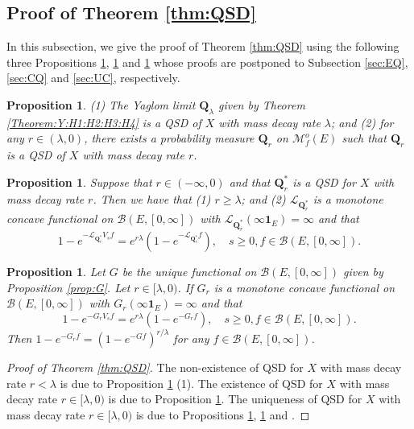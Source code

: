 \documentclass[12pt,a4paper]{amsart}
\numberwithin{equation}{section}
\theoremstyle{plain}
\newtheorem{prop}[thm]{Proposition}
\theoremstyle{definition}
\theoremstyle{remark}
\begin{document}
\subsection{Proof of Theorem \ref{thm:QSD}}
	In this subsection,
	we give the proof of Theorem \ref{thm:QSD} using the following three
Propositions \ref{prop:EQ}, \ref{prop:CQ} and \ref{prop:UC}  whose proofs are postponed to
Subsection \ref{sec:EQ}, \ref{sec:CQ} and \ref{sec:UC}, respectively.

\begin{prop} \label{prop:EQ}
	(1) The Yaglom limit $\mathbf Q_\lambda$ given by Theorem \ref{Theorem:Y:H1:H2:H3:H4} is a QSD of $X$ with mass decay rate $\lambda$; and
	(2) for any $r \in (\lambda , 0)$, %
	there exists a probability measure $\mathbf Q_r$  on $\mathcal M^o_f(E)$
such that  $\mathbf Q_r$ is a QSD of $X$ with mass decay rate $r$.
\end{prop}


\begin{prop} \label{prop:CQ}
	Suppose that $r \in (-\infty, 0)$ and that  $\mathbf Q^*_{r}$
	is a QSD
	for $X$ with mass decay rate $r$.
	Then we have that (1) $r \geq \lambda$; and
	(2) $\mathscr L_{\mathbf Q^*_r}$ is a monotone concave functional on $\mathcal B(E,[0,\infty])$ %
	with $\mathscr L_{\mathbf Q^*_r}(\infty \mathbf 1_E) = \infty$ and that
\[
	1 - e^{- \mathscr L_{\mathbf Q^*_r} V_s f} = e^{r\lambda }(1- e^{- \mathscr L_{\mathbf Q^*_r} f}), \quad s\geq 0, f\in \mathcal B(E,[0,\infty]).
\]
\end{prop}

\begin{prop} \label{prop:UC}
	Let $G$ be the unique functional on $\mathcal B(E,[0,\infty])$ given by Proposition \ref{prop:G}.
	Let $r \in [\lambda, 0)$.
	If $G_r$ is a monotone concave functional on $\mathcal B(E,[0,\infty])$ with %
	$G_r(\infty \mathbf 1_E) = \infty$ and that
\[
	1 - e^{-G_r V_s f} = e^{r\lambda }(1- e^{- G_r f}), \quad s\geq 0, f\in \mathcal B(E,[0,\infty]).
\]
	Then $1 - e^{-G_rf} = (1 - e^{- G f})^{r/\lambda}$ for any $f\in \mathcal B(E,[0,\infty])$.
\end{prop}

\begin{proof}[Proof of Theorem \ref{thm:QSD}]
	The non-existence of QSD for $X$ with mass decay rate $r < \lambda$ is due to Proposition \ref{prop:CQ} (1).
	The existence of QSD for $X$ with mass decay rate $r \in [\lambda,0)$ is due to Proposition \ref{prop:EQ}.
	The uniqueness of QSD for $X$ with mass decay rate $r\in [\lambda , 0)$ is due to Propositions \ref{prop:CQ}, \ref{prop:UC} and \cite[Theorem 1.17]{Li2011MeasureValued}.
\end{proof}
\end{document}
